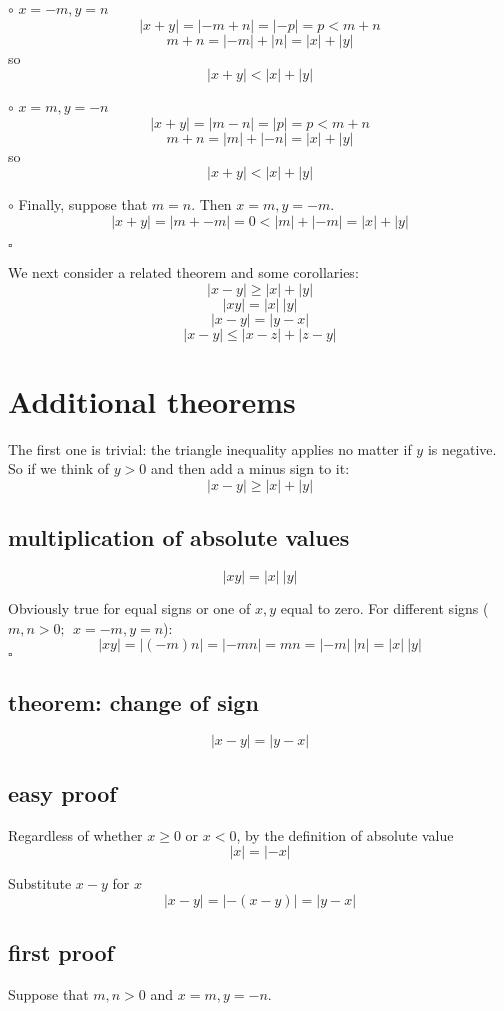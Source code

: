 \documentclass[11pt, oneside]{article}
\begin{document}
$\circ$  $x = -m, y = n$
\[ |x + y| = |-m + n| = |-p| = p < m + n \]
\[ m + n = |-m| + |n| = |x| + |y| \]
so
\[ |x + y| < |x| + |y| \]

$\circ$  $x = m, y = -n$
\[ |x + y| = |m - n| = |p| = p < m + n \]
\[ m + n = |m| + |-n| = |x| + |y| \]
so
\[ |x + y| < |x| + |y| \]

$\circ$  Finally, suppose that $m=n$.  Then $x = m, y = -m$.
\[ |x + y| = |m + -m| = 0 < |m| + |-m| = |x| + |y| \]

$\square$

We next consider a related theorem and some corollaries:
\[ |x - y| \ge |x| + |y| \]
\[ |xy| = |x| \ |y| \]
\[ |x - y| = |y - x| \]
\[ |x - y| \le |x - z| + |z - y| \]

\section{Additional theorems}
The first one is trivial:  the triangle inequality applies no matter if $y$ is negative.  So if we think of $y > 0$ and then add a minus sign to it:
\[ |x - y| \ge |x| + |y| \]

\subsection*{multiplication of absolute values}
\[ |xy| = |x| \ |y| \]

Obviously true for equal signs or one of $x,y$ equal to zero.  For different signs ($m,n > 0; \ \ x = -m, y = n$):
\[ |xy| = |(-m)n| = |-mn| = mn = |-m| \ |n| = |x| \ |y| \]
$\square$

\subsection*{theorem:  change of sign}
\[ |x - y| = |y - x| \]

\subsection*{easy proof}

Regardless of whether $x \ge 0$ or $x < 0$, by the definition of absolute value
\[ |x| = |-x| \]

Substitute $x - y$ for $x$
\[ |x - y| = |-(x - y)| = |y - x| \]

\subsection*{first proof}
Suppose that $m,n > 0$ and $x = m, y =-n$.
\end{document}
